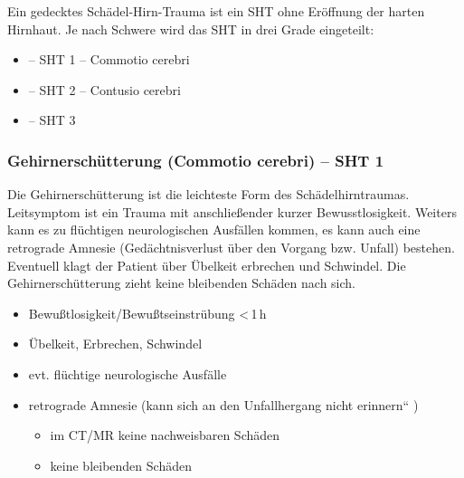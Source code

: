Ein gedecktes Schädel-Hirn-Trauma ist ein SHT ohne Eröffnung der harten
Hirnhaut. Je nach Schwere wird das SHT in drei Grade eingeteilt:

\begin{itemize}
\item {} -- SHT 1{\textdegree} --
Commotio cerebri
\item {} -- SHT 2{\textdegree} -- Contusio
cerebri
\item {} -- SHT 3{\textdegree} 
\end{itemize}

\subsubsection{Gehirnerschütterung (Commotio cerebri) --
SHT 1\textdegree}

{
Die Gehirnerschütterung ist die leichteste Form des
Schädelhirntraumas. Leitsymptom ist ein Trauma mit
anschließender kurzer Bewusstlosigkeit. Weiters kann es zu
flüchtigen neurologischen Ausfällen kommen, es kann auch eine
retrograde Amnesie (Gedächtnisverlust über den Vorgang
bzw. Unfall) bestehen. Eventuell klagt der Patient über
Übelkeit erbrechen und Schwindel. Die Gehirnerschütterung
zieht keine bleibenden Schäden nach sich.
}{
\begin{itemize}
    \item  Bewußtlosigkeit/Bewußtseinstrübung
    {\textless}\,1\,h
    \item Übelkeit, Erbrechen, Schwindel
    \item evt. flüchtige neurologische Ausfälle
    \item retrograde  Amnesie  ({\quotedblbase}kann sich an den
    Unfallhergang nicht erinnern{\textquotedblleft} )
    \begin{itemize}
        \item im CT/MR 
        keine nachweisbaren Schäden
        \item keine  bleibenden Schäden
    \end{itemize}
\end{itemize}
}{}{}{}




